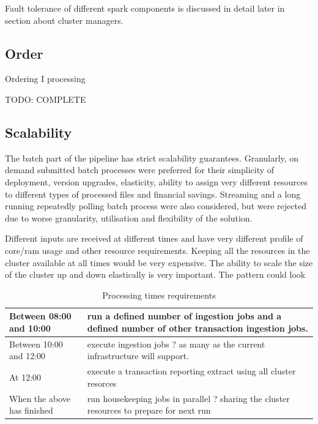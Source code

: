 \documentclass[a4paper, 10 pt, conference]{IEEEtran}
\begin{document}
Fault tolerance of different spark components is discussed in detail later in section about cluster managers.

\subsection{Order}
Ordering
I processing

TODO: COMPLETE

\subsection{Scalability}
The batch part of the pipeline has strict scalability guarantees. Granularly, on demand submitted batch processes were preferred for their simplicity of deployment, version upgrades, elasticity, ability to assign very different resources to different types of processed files and financial savings. Streaming and a long running repeatedly polling batch process were also considered, but were rejected due to worse granularity, utilisation and flexibility of the solution.

Different inputs are received at different times and have very different profile of core/ram usage and other resource requirements. Keeping all the resources in the cluster available at all times would be very expensive. The ability to scale the size of the cluster up and down elastically is very important. The pattern could look 

\begin{table}[h]
\caption{Processing times requirements}
\label{tbl:processing-times-requirements}
\begin{center}
  \begin{tabular}{ | l | p{3cm} | }
    \hline
    Between 08:00 and 10:00 & run a defined number of ingestion jobs and a defined number of other transaction ingestion jobs.  \\ \hline
    Between 10:00 and 12:00 & execute ingestion jobs ? as many as the current infrastructure will support. \\ \hline
    At 12:00 & execute a transaction reporting extract using all cluster resorces \\ \hline
    When the above has finished & run housekeeping jobs in parallel ? sharing the cluster resources to prepare for next run \\
    \hline
  \end{tabular}
\end{center}
\end{table}
\end{document}

